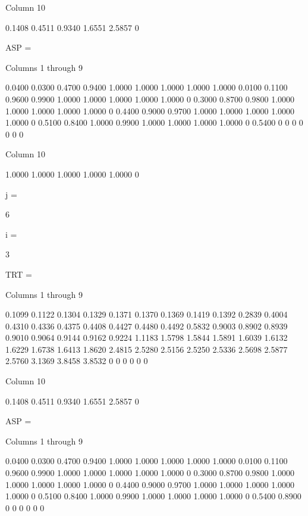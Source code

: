   Column 10

    0.1408
    0.4511
    0.9340
    1.6551
    2.5857
         0


ASP =

  Columns 1 through 9

    0.0400    0.0300    0.4700    0.9400    1.0000    1.0000    1.0000    1.0000    1.0000
    0.0100    0.1100    0.9600    0.9900    1.0000    1.0000    1.0000    1.0000    1.0000
         0    0.3000    0.8700    0.9800    1.0000    1.0000    1.0000    1.0000    1.0000
         0    0.4400    0.9000    0.9700    1.0000    1.0000    1.0000    1.0000    1.0000
         0    0.5100    0.8400    1.0000    0.9900    1.0000    1.0000    1.0000    1.0000
         0    0.5400         0         0         0         0         0         0         0

  Column 10

    1.0000
    1.0000
    1.0000
    1.0000
    1.0000
         0


j =

     6


i =

     3


TRT =

  Columns 1 through 9

    0.1099    0.1122    0.1304    0.1329    0.1371    0.1370    0.1369    0.1419    0.1392
    0.2839    0.4004    0.4310    0.4336    0.4375    0.4408    0.4427    0.4480    0.4492
    0.5832    0.9003    0.8902    0.8939    0.9010    0.9064    0.9144    0.9162    0.9224
    1.1183    1.5798    1.5844    1.5891    1.6039    1.6132    1.6229    1.6738    1.6413
    1.8620    2.4815    2.5280    2.5156    2.5250    2.5336    2.5698    2.5877    2.5760
    3.1369    3.8458    3.8532         0         0         0         0         0         0

  Column 10

    0.1408
    0.4511
    0.9340
    1.6551
    2.5857
         0


ASP =

  Columns 1 through 9

    0.0400    0.0300    0.4700    0.9400    1.0000    1.0000    1.0000    1.0000    1.0000
    0.0100    0.1100    0.9600    0.9900    1.0000    1.0000    1.0000    1.0000    1.0000
         0    0.3000    0.8700    0.9800    1.0000    1.0000    1.0000    1.0000    1.0000
         0    0.4400    0.9000    0.9700    1.0000    1.0000    1.0000    1.0000    1.0000
         0    0.5100    0.8400    1.0000    0.9900    1.0000    1.0000    1.0000    1.0000
         0    0.5400    0.8900         0         0         0         0         0         0

